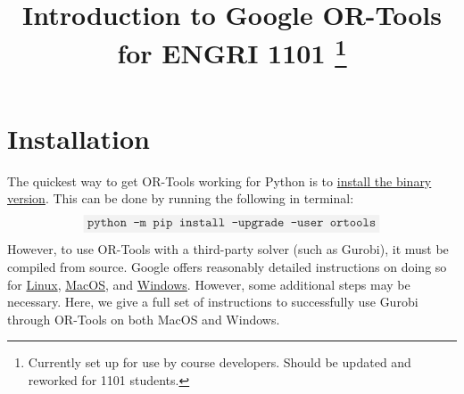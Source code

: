 \documentclass[11 pt]{article}
\title{Introduction to Google OR-Tools for ENGRI 1101 \footnote{Currently set up for use by course developers. Should be updated and reworked for 1101 students.}}
\newcommand{\code}[1]{\colorbox{gray!10}{\textcolor{black!85}{\texttt{#1}}}}
\begin{document}
\date{}

\maketitle

\section{Installation}

The quickest way to get OR-Tools working for Python is to \href{https://developers.google.com/optimization/install}{install the binary version}. This can be done by running the following in terminal:
$$\code{python -m pip install --upgrade --user ortools}$$
However, to use OR-Tools with a third-party solver (such as Gurobi), it must be compiled from source. Google offers reasonably detailed instructions on doing so for \href{https://developers.google.com/optimization/install/python/source_linux}{Linux}, \href{https://developers.google.com/optimization/install/python/source_mac}{MacOS}, and \href{https://developers.google.com/optimization/install/python/source_windows}{Windows}. However, some additional steps may be necessary. Here, we give a full set of instructions to successfully use Gurobi through OR-Tools on both MacOS and Windows. \newline
\end{document}
